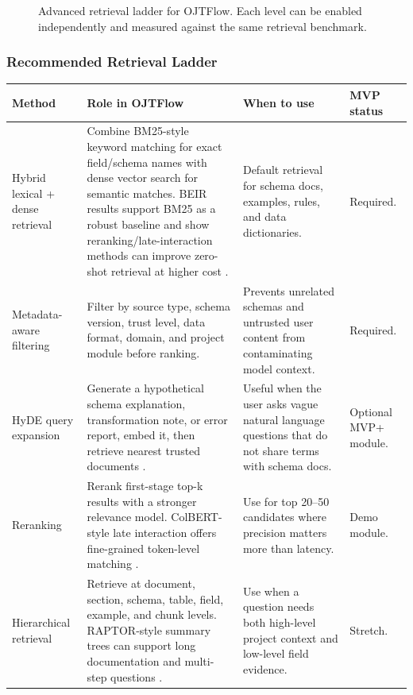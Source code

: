 \begin{figure}[H]
  \centering
  \resizebox{\textwidth}{!}{}
  \caption{Advanced retrieval ladder for OJTFlow. Each level can be enabled independently and measured against the same retrieval benchmark.}
  \label{fig:advanced-retrieval}
\end{figure}

\subsubsection{Recommended Retrieval Ladder}

\begin{longtable}{p{}p{}p{}p{}}
\toprule
\textbf{Method} & \textbf{Role in OJTFlow} & \textbf{When to use} & \textbf{MVP status} \\
\midrule
Hybrid lexical + dense retrieval & Combine BM25-style keyword matching for exact field/schema names with dense vector search for semantic matches. BEIR results support BM25 as a robust baseline and show reranking/late-interaction methods can improve zero-shot retrieval at higher cost \cite{thakur2021beir}. & Default retrieval for schema docs, examples, rules, and data dictionaries. & Required. \\
\addlinespace
Metadata-aware filtering & Filter by source type, schema version, trust level, data format, domain, and project module before ranking. & Prevents unrelated schemas and untrusted user content from contaminating model context. & Required. \\
\addlinespace
HyDE query expansion & Generate a hypothetical schema explanation, transformation note, or error report, embed it, then retrieve nearest trusted documents \cite{gao2022hyde}. & Useful when the user asks vague natural language questions that do not share terms with schema docs. & Optional MVP+ module. \\
\addlinespace
Reranking & Rerank first-stage top-k results with a stronger relevance model. ColBERT-style late interaction offers fine-grained token-level matching \cite{khattab2020colbert}. & Use for top 20--50 candidates where precision matters more than latency. & Demo module. \\
\addlinespace
Hierarchical retrieval & Retrieve at document, section, schema, table, field, example, and chunk levels. RAPTOR-style summary trees can support long documentation and multi-step questions \cite{sarthi2024raptor}. & Use when a question needs both high-level project context and low-level field evidence. & Stretch. \\

\end{longtable}
